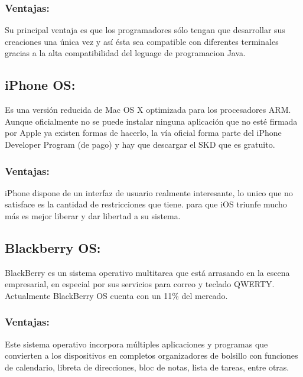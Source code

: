 \documentclass{bmcart}
\begin{document}
\subsubsection*{Ventajas:}

Su principal ventaja es que los programadores sólo tengan que desarrollar sus creaciones
una única vez y así ésta sea compatible con diferentes terminales gracias a la alta compatibilidad del leguage de programacion Java. 


\subsection*{ iPhone OS:}

Es una versión reducida de Mac OS X optimizada para los procesadores
ARM. Aunque oficialmente no se puede instalar ninguna aplicación que no esté
firmada por Apple ya existen formas de hacerlo, la vía oficial forma parte del iPhone
Developer Program (de pago) y hay que descargar el SKD que es gratuito.\cite{del2009sistemas}

\subsubsection*{Ventajas:}

iPhone dispone de un interfaz de usuario realmente interesante, lo unico que no satisface es la
cantidad de restricciones que tiene. para que iOS
triunfe mucho más es mejor liberar y dar libertad a su sistema.


\subsection*{ Blackberry OS:}

BlackBerry es un sistema operativo multitarea que está arrasando en la escena
empresarial, en especial por sus servicios para correo y teclado QWERTY.
Actualmente BlackBerry OS cuenta con un 11\% del mercado.\cite{del2009sistemas}

\subsubsection*{Ventajas:}
Este sistema operativo incorpora múltiples aplicaciones y programas
que convierten a los dispositivos en completos organizadores de bolsillo con
funciones de calendario, libreta de direcciones, bloc de notas, lista de tareas, entre
otras.



\newpage  
\end{document}
